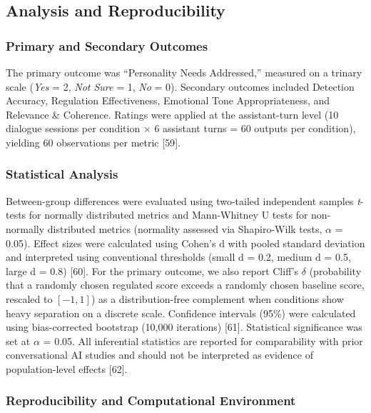 \documentclass[apajournal,article,submit,moreauthors]{Definitions/mdpi}
\begin{document}
\subsection{Analysis and Reproducibility}\label{analysis-and-reproducibility}

\subsubsection{Primary and Secondary Outcomes}\label{primary-and-secondary-outcomes}

The primary outcome was ``Personality Needs Addressed,'' measured on a trinary scale (\textit{Yes} = 2, \textit{Not Sure} = 1, \textit{No} = 0). Secondary outcomes included Detection Accuracy, Regulation Effectiveness, Emotional Tone Appropriateness, and Relevance \& Coherence. Ratings were applied at the assistant-turn level (10 dialogue sessions per condition $\times$ 6 assistant turns = 60 outputs per condition), yielding 60 observations per metric {[}59{]}.

\subsubsection{Statistical Analysis}\label{statistical-analysis}

Between-group differences were evaluated using two-tailed independent samples \textit{t}-tests for normally distributed metrics and Mann-Whitney U tests for non-normally distributed metrics (normality assessed via Shapiro-Wilk tests, $\alpha$ = 0.05). Effect sizes were calculated using Cohen's d with pooled standard deviation and interpreted using conventional thresholds (small d = 0.2, medium d = 0.5, large d = 0.8) {[}60{]}. For the primary outcome, we also report Cliff's \(\delta\) (probability that a randomly chosen regulated score exceeds a randomly chosen baseline score, rescaled to \([-1,1]\)) as a distribution-free complement when conditions show heavy separation on a discrete scale. Confidence intervals (95\%) were calculated using bias-corrected bootstrap (10,000 iterations) {[}61{]}. Statistical significance was set at $\alpha$ = 0.05. All inferential statistics are reported for comparability with prior conversational AI studies and should not be interpreted as evidence of population-level effects {[}62{]}.

\subsubsection{Reproducibility and Computational Environment}\label{reproducibility-and-computational-environment}
\end{document}
